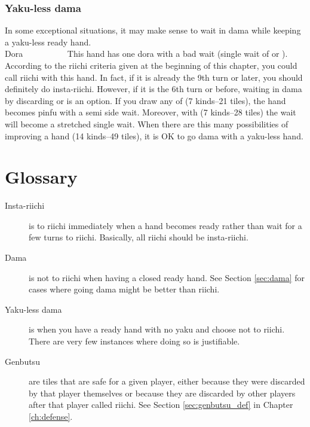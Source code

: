 \subsubsection*{{\jap Yaku}-less {\jap dama}}
In some exceptional situations, it may make sense to wait in {\jap dama} while keeping a {\jap yaku}-less ready hand. 
\bp
{}~~\\
\hfill\footnotesize{{\jap Dora}~~~~~~~~~~}
\ep
This hand has one {\jap dora} with a bad wait (single wait of {\LARGE {}} or {\LARGE {}}). According to the riichi criteria given at the beginning of this chapter, you could call riichi with this hand. In fact, if it is already the 9th turn or later, you should definitely do insta-riichi. However, if it is the 6th turn or before, waiting in {\jap dama} by discarding {\LARGE {}} or {\LARGE{}} is an option. 
If you draw any of {\LARGE{}} (7 kinds--21 tiles), the hand becomes {\jap pinfu} with a semi side wait. Moreover, with {\LARGE{}} (7 kinds--28 tiles) the wait will become a stretched single wait. When there are this many possibilities of improving a hand (14 kinds--49 tiles), it is OK to go {\jap dama} with a {\jap yaku}-less hand.

\bigskip
\section{Glossary}

\begin{description}
\item[Insta-riichi] is to riichi immediately when a hand becomes ready rather than wait for a few turns to riichi. Basically, all riichi should be insta-riichi.
\item[{\jap Dama}] is not to riichi when having a closed ready hand. See Section \ref{sec:dama} for cases where going {\jap dama} might be better than riichi. 
\item[{\jap Yaku}-less {\jap dama}] is when you have a ready hand with no {\jap yaku} and choose not to riichi. There are very few instances where doing so is justifiable. 
\item[{\jap Genbutsu}] are tiles that are safe for a given player, either because they were discarded by that player themselves or because they are discarded by other players after that player called riichi. See Section \ref{sec:genbutsu_def} in Chapter \ref{ch:defense}.
\end{description}

